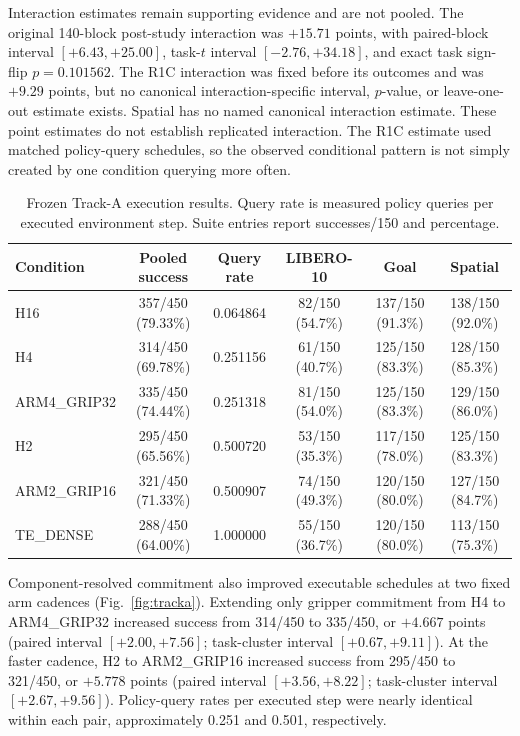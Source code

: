 Interaction estimates remain supporting evidence and are not pooled. The
original 140-block post-study interaction was $+15.71$ points, with paired-block
interval $[+6.43,+25.00]$, task-$t$ interval $[-2.76,+34.18]$, and exact task
sign-flip $p=0.101562$. The R1C interaction was fixed before its outcomes and
was $+9.29$ points, but no canonical interaction-specific interval, $p$-value,
or leave-one-out estimate exists. Spatial has no named canonical interaction
estimate. These point estimates do not establish replicated interaction. The
R1C estimate used matched policy-query schedules, so the observed conditional
pattern is not simply created by one condition querying more often.



\begin{table}[t]
\centering
\caption{Frozen Track-A execution results. Query rate is measured policy
queries per executed environment step. Suite entries report successes/150 and
percentage.}
\label{tab:tracka}
\small
\begin{tabular*}{\textwidth}{@{\extracolsep{\fill}}lccccc}
\toprule
Condition & Pooled success & Query rate & LIBERO-10 & Goal & Spatial \\
\midrule
H16 & 357/450 (79.33\%) & 0.064864 & 82/150 (54.7\%) & 137/150 (91.3\%) & 138/150 (92.0\%) \\
H4 & 314/450 (69.78\%) & 0.251156 & 61/150 (40.7\%) & 125/150 (83.3\%) & 128/150 (85.3\%) \\
ARM4\_GRIP32 & 335/450 (74.44\%) & 0.251318 & 81/150 (54.0\%) & 125/150 (83.3\%) & 129/150 (86.0\%) \\
H2 & 295/450 (65.56\%) & 0.500720 & 53/150 (35.3\%) & 117/150 (78.0\%) & 125/150 (83.3\%) \\
ARM2\_GRIP16 & 321/450 (71.33\%) & 0.500907 & 74/150 (49.3\%) & 120/150 (80.0\%) & 127/150 (84.7\%) \\
TE\_DENSE & 288/450 (64.00\%) & 1.000000 & 55/150 (36.7\%) & 120/150 (80.0\%) & 113/150 (75.3\%) \\
\bottomrule
\end{tabular*}
\end{table}

Component-resolved commitment also improved executable schedules at two fixed
arm cadences (Fig.~\ref{fig:tracka}). Extending only gripper commitment from H4
to ARM4\_GRIP32 increased success from 314/450 to 335/450, or $+4.667$ points
(paired interval $[+2.00,+7.56]$; task-cluster interval
$[+0.67,+9.11]$). At the faster cadence, H2 to ARM2\_GRIP16 increased success
from 295/450 to 321/450, or $+5.778$ points (paired interval
$[+3.56,+8.22]$; task-cluster interval $[+2.67,+9.56]$). Policy-query rates
per executed step were nearly identical within each pair, approximately 0.251
and 0.501, respectively.

